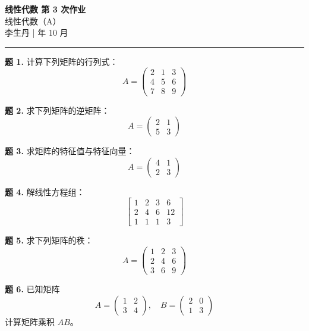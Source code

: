 \documentclass[12pt, a4paper]{article}
\begin{document}
\begin{center}
    {\LARGE\bfseries 线性代数 第 3 次作业}\\[0.5em]
    {\large 线性代数（A）}\\[0.3em]
    李生丹 \quad |  年 10 月
\end{center}
\hrule
\vspace{1em}

\noindent\textbf{题 1.} 计算下列矩阵的行列式：
\[A = \begin{pmatrix} 2 & 1 & 3 \\ 4 & 5 & 6 \\ 7 & 8 & 9 \end{pmatrix}\]

\vspace{0.8em}
\noindent\textbf{题 2.} 求下列矩阵的逆矩阵：
\[A = \begin{pmatrix} 2 & 1 \\ 5 & 3 \end{pmatrix}\]

\vspace{0.8em}
\noindent\textbf{题 3.} 求矩阵的特征值与特征向量：
\[A = \begin{pmatrix} 4 & 1 \\ 2 & 3 \end{pmatrix}\]

\vspace{0.8em}
\noindent\textbf{题 4.} 解线性方程组：
\[\left[\begin{array}{ccc|c} 1 & 2 & 3 & 6 \\ 2 & 4 & 6 & 12 \\ 1 & 1 & 1 & 3 \end{array}\right]\]

\vspace{0.8em}
\noindent\textbf{题 5.} 求下列矩阵的秩：
\[A = \begin{pmatrix} 1 & 2 & 3 \\ 2 & 4 & 6 \\ 3 & 6 & 9 \end{pmatrix}\]

\vspace{0.8em}
\noindent\textbf{题 6.} 已知矩阵
\[A = \begin{pmatrix} 1 & 2 \\ 3 & 4 \end{pmatrix} , \quad B = \begin{pmatrix} 2 & 0 \\ 1 & 3 \end{pmatrix}\]
计算矩阵乘积 $AB$。
\end{document}
